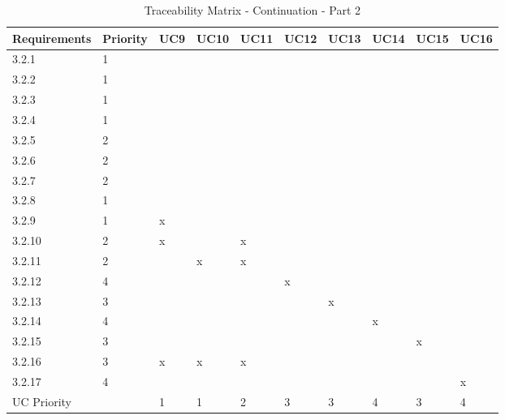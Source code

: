\documentclass[runningheads,a4paper]{article}
\begin{document}
\begin{table}[]
\centering
\caption{Traceability Matrix - Continuation - Part 2}
\label{my-label}
\begin{tabular}{|l|l|l|l|l|l|l|l|l|l|}
\hline
Requirements      & Priority      & UC9 & UC10 & UC11 & UC12 & UC13 & UC14 & UC15 & UC16 \\ \hline
3.2.1             & 1             &     &      &      &      &      &      &      &      \\ \hline
3.2.2             & 1             &     &      &      &      &      &      &      &      \\ \hline
3.2.3             & 1             &     &      &      &      &      &      &      &      \\ \hline
3.2.4             & 1             &     &      &      &      &      &      &      &      \\ \hline
3.2.5             & 2             &     &      &      &      &      &      &      &      \\ \hline
3.2.6             & 2             &     &      &      &      &      &      &      &      \\ \hline
3.2.7             & 2             &     &      &      &      &      &      &      &      \\ \hline
3.2.8             & 1             &     &      &      &      &      &      &      &      \\ \hline
3.2.9             & 1             & x   &      &      &      &      &      &      &      \\ \hline
3.2.10            & 2             & x   &      & x    &      &      &      &      &      \\ \hline
3.2.11            & 2             &     & x    & x    &      &      &      &      &      \\ \hline
3.2.12            & 4             &     &      &      & x    &      &      &      &      \\ \hline
3.2.13            & 3             &     &      &      &      & x    &      &      &      \\ \hline
3.2.14            & 4             &     &      &      &      &      & x    &      &      \\ \hline
3.2.15            & 3             &     &      &      &      &      &      & x    &      \\ \hline
3.2.16            & 3             & x   & x    & x    &      &      &      &      &      \\ \hline
3.2.17            & 4             &     &      &      &      &      &      &      & x    \\ \hline
\multicolumn{2}{|l|}{UC Priority} & 1   & 1    & 2    & 3    & 3    & 4    & 3    & 4    \\ \hline
\end{tabular}
\end{table}
\end{document}
